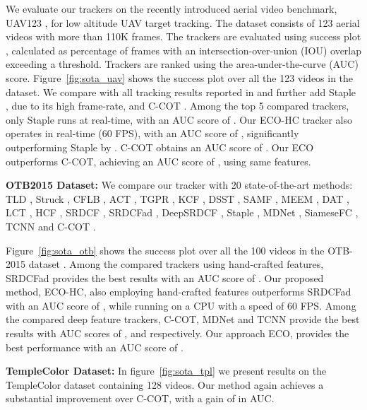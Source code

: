\documentclass[10pt,twocolumn,letterpaper]{article}
\newcommand{\parsection}[1]{\noindent\textbf{#1:}}
\begin{document}
We evaluate our trackers on the recently introduced aerial video benchmark, UAV123 \cite{UAV123}, for low altitude UAV target tracking. The dataset consists of 123 aerial videos with more than 110K frames. The trackers are evaluated using success plot \cite{Wu13}, calculated as percentage of frames with an intersection-over-union (IOU) overlap exceeding a threshold. Trackers are ranked using the area-under-the-curve (AUC) score. Figure~\ref{fig:sota_uav} shows the success plot over all the 123 videos in the dataset. We compare with all tracking results reported in \cite{UAV123} and further add Staple \cite{Staple}, due to its high frame-rate, and C-COT \cite{DanelljanECCV2016}. Among the top 5 compared trackers, only Staple runs at real-time, with an AUC score of . Our ECO-HC tracker also operates in real-time (60 FPS), with an AUC score of , significantly outperforming Staple by . C-COT obtains an AUC score of . Our ECO outperforms C-COT, achieving an AUC score of , using same features.

\parsection{OTB2015 Dataset}
We compare our tracker with 20 state-of-the-art methods: TLD \cite{Mikolajczyk10d}, Struck \cite{Torr11b}, CFLB \cite{GaloogahiCVPR2015}, ACT \cite{DanelljanCVPR14}, TGPR \cite{TGPR2014}, KCF \cite{Henriques14}, DSST \cite{DanelljanBMVC14}, SAMF \cite{Li2014}, MEEM \cite{MEEM2014}, DAT \cite{possegger15a}, LCT \cite{LTC_CVPR15}, HCF \cite{HCF_ICCV15}, SRDCF \cite{DanelljanICCV2015}, SRDCFad \cite{DanelljanCVPR2016a}, DeepSRDCF \cite{DanelljanVOT2015}, Staple \cite{Staple}, MDNet \cite{MDNet}, SiameseFC \cite{SiameseFC}, TCNN \cite{TCNN} and C-COT \cite{DanelljanECCV2016}.

Figure~\ref{fig:sota_otb} shows the success plot over all the 100 videos in the OTB-2015
dataset \cite{OTB2015}. Among the compared trackers using hand-crafted features, SRDCFad provides the best results with an AUC score of . Our proposed method, ECO-HC, also employing hand-crafted features outperforms SRDCFad with an AUC score of , while running on a CPU with a speed of 60 FPS. Among the compared deep feature trackers, C-COT, MDNet and TCNN provide the best results with AUC scores of ,  and  respectively. Our approach ECO, provides the best performance with an AUC score of .

\parsection{TempleColor Dataset}
In figure~\ref{fig:sota_tpl} we present results on the TempleColor dataset \cite{TempleColor} containing 128 videos. Our method again achieves a substantial improvement over C-COT, with a gain of  in AUC.
 
\end{document}
